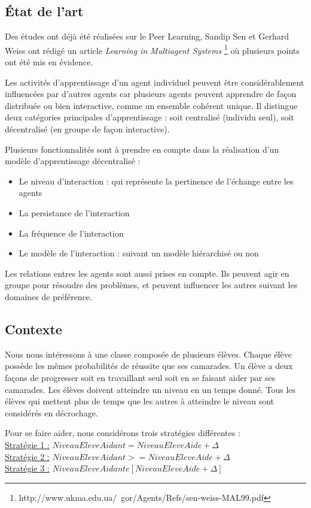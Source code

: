 \documentclass{article}
\begin{document}
\subsection{État de l'art}

Des études ont déjà été réalisées sur le Peer Learning, Sandip Sen et Gerhard Weiss ont rédigé un article \textit{Learning in Multiagent Systems} \footnote{http://www.ukma.edu.ua/~gor/Agents/Refs/sen-weiss-MAL99.pdf} où plusieurs points ont été mis en évidence.

	Les activités d'apprentissage d'un agent individuel peuvent être considérablement influencées par d'autres agents car plusieurs agents peuvent apprendre de façon distribuée ou bien interactive, comme un ensemble cohérent unique. Il distingue deux catégories principales d'apprentissage : soit centralisé (individu seul), soit décentralisé (en groupe de façon interactive).

	Plusieurs fonctionnalités sont à prendre en compte dans la réalisation d'un modèle d'apprentissage décentralisé :
\begin{itemize}
	\item Le niveau d'interaction : qui représente la pertinence de l'échange entre les agents
	\item La persistance de l'interaction
	\item La fréquence de l'interaction
	\item Le modèle de l'interaction : suivant un modèle hiérarchisé ou non 
\end{itemize}	  	 

		Les relations entres les agents sont aussi prises en compte. Ils peuvent agir en groupe pour résoudre des problèmes, et peuvent influencer les autres suivant les domaines de préférence.
		 
\subsection{Contexte}

Nous nous intéressons à une classe composée de plusieurs élèves. Chaque élève possède les mêmes probabilités de réussite que ses camarades. Un élève a deux façons de progresser soit en travaillant seul soit en se faisant aider par ses camarades. Les élèves doivent atteindre un niveau en un temps donné. Tous les élèves qui mettent plus de temps que les autres à atteindre le niveau sont considérés en décrochage.

	Pour se faire aider, nous considérons trois stratégies différentes :\\
\underline{Stratégie 1 :} $NiveauEleveAidant = NiveauEleveAide + \Delta$\\
\underline{Stratégie 2 :} $NiveauEleveAidant >= NiveauEleveAide + \Delta$\\
\underline{Stratégie 3 :} $NiveauEleveAidant e [NiveauEleveAide + \Delta]$\\
\end{document}
